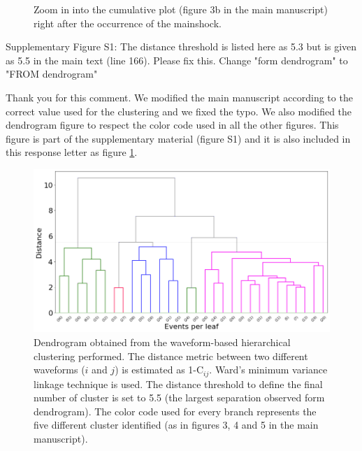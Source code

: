 \documentclass[10pt]{extarticle}
\begin{document}
\begin{Answer}
\begin{figure}[!h]
\begin{center}
\end{center}
\caption{Zoom in into the cumulative plot (figure 3b in the main manuscript) right after the occurrence of the mainshock.}
\end{figure}
 \WorkInProgressRevTask
\end{Answer}
%
%



\begin{ReviewerComment}{2}
\noindent 
Supplementary Figure S1: The distance threshold is listed here as 5.3 but is given as 5.5 in the main text (line 166). Please fix this. Change "form dendrogram" to "FROM dendrogram"
\end{ReviewerComment}


\begin{Answer}
Thank you for this comment. We modified the main manuscript according to the correct value used for the clustering and we fixed the typo. We also modified the dendrogram figure to respect the color code used in all the other figures. This figure is part of the supplementary material (figure S1) and it is also included in this response letter as figure \ref{fig:dendrogram}.
\begin{figure}[!h]
\begin{center}
 \includegraphics[width=1\linewidth]{dendrogram_balsorano.png} 
\end{center}
\caption{Dendrogram obtained from the waveform-based hierarchical clustering performed. The distance metric between two different waveforms ($i$ and $j$) is estimated as 1-C$_{ij}$. Ward's minimum variance linkage technique is used. The distance threshold to define the final number of cluster is set to 5.5 (the largest separation observed form dendrogram). The color code used for every branch represents the five different cluster identified (as in figures 3, 4 and 5 in the main manuscript).}
\label{fig:dendrogram}
\end{figure}
 \WorkInProgressRevTask
\end{Answer}
%
%
\end{document}
